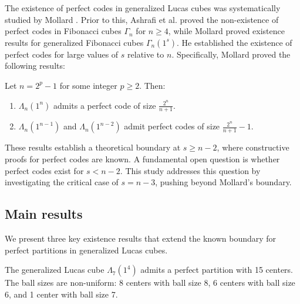 The existence of perfect codes in generalized Lucas cubes was systematically studied by Mollard \cite{Mollard2022}. Prior to this, Ashrafi et al. \cite{aabfk2016} proved the non-existence of perfect codes in Fibonacci cubes $\Gamma_n$ for $n \ge 4$, while Mollard \cite{mo2018} proved existence results for generalized Fibonacci cubes $\Gamma_n(1^s)$. He established the existence of perfect codes for large values of $s$ relative to $n$. Specifically, Mollard proved the following results:

\begin{theorem}[Mollard]
Let $n = 2^p - 1$ for some integer $p \ge 2$. Then:
\begin{enumerate}
    \item $\Lambda_n(1^n)$ admits a perfect code of size $\frac{2^n}{n+1}$.
    \item $\Lambda_n(1^{n-1})$ and $\Lambda_n(1^{n-2})$ admit perfect codes of size $\frac{2^n}{n+1} - 1$.
\end{enumerate}
\end{theorem}

These results establish a theoretical boundary at $s \ge n-2$, where constructive proofs for perfect codes are known. A fundamental open question is whether perfect codes exist for $s < n-2$. This study addresses this question by investigating the critical case of $s = n-3$, pushing beyond Mollard's boundary.
\subsection{Main results}

We present three key existence results that extend the known boundary for perfect partitions in generalized Lucas cubes.

\begin{theorem}\label{thm:lambda74}
The generalized Lucas cube $\Lambda_7(1^4)$ admits a perfect partition with 15 centers. The ball sizes are non-uniform: 8 centers with ball size 8, 6 centers with ball size 6, and 1 center with ball size 7.
\end{theorem}

